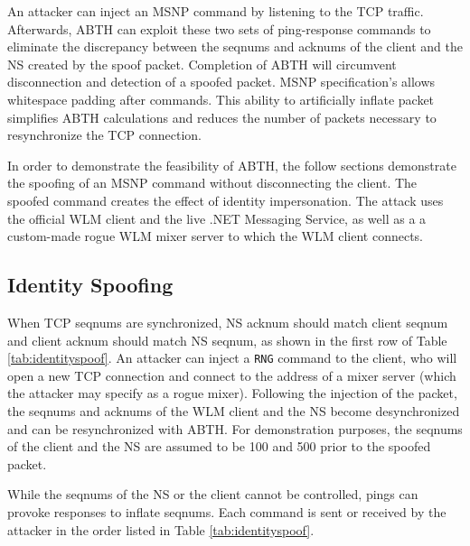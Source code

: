 \documentclass{sig-alternate}
\begin{document}
An attacker can inject an MSNP command by listening to the TCP traffic.
Afterwards, ABTH can exploit these two sets of ping-response commands to eliminate the discrepancy between the seqnums and acknums of the client and the NS created by the spoof packet.
Completion of ABTH will circumvent disconnection and detection of a spoofed packet.
MSNP specification's allows whitespace padding after commands.
This ability to artificially inflate packet simplifies ABTH calculations and reduces the number of packets necessary to resynchronize the TCP connection.

In order to demonstrate the feasibility of ABTH, the follow sections demonstrate the spoofing of an MSNP command without disconnecting the client.
The spoofed command creates the effect of identity impersonation.
The attack uses the official WLM client and the live .NET Messaging Service, as well as a a custom-made rogue WLM mixer server to which the WLM client connects.

\subsection{Identity Spoofing}

When TCP seqnums are synchronized, NS acknum should match client seqnum and client acknum should match NS seqnum, as shown in the first row of Table \ref{tab:identityspoof}.
An attacker can inject a \texttt{RNG} command to the client, who will open a new TCP connection and connect to the address of a mixer server (which the attacker may specify as a rogue mixer).
Following the injection of the packet, the seqnums and acknums of the WLM client and the NS become desynchronized and can be resynchronized with ABTH.
For demonstration purposes, the seqnums of the client and the NS are assumed to be 100 and 500 prior to the spoofed packet.

While the seqnums of the NS or the client cannot be controlled, pings can provoke responses to inflate seqnums.
Each command is sent or received by the attacker in the order listed in Table \ref{tab:identityspoof}.
\end{document}
